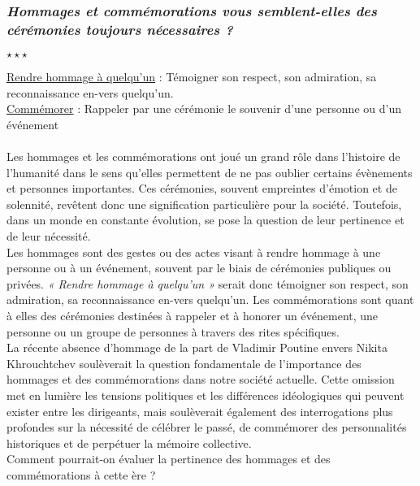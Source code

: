 \begin{center}
	\subsubsection*{\textit{Hommages et commémorations vous semblent-elles des cérémonies toujours nécessaires ?}}
	$\star \star \star$
\end{center}
\underline{Rendre hommage à quelqu’un} : Témoigner son respect, son admiration, sa reconnaissance en-vers quelqu’un.\\
\underline{Commémorer} : Rappeler par une cérémonie le souvenir d’une personne ou d’un événement\\\\
\hspace*{0.5cm}Les hommages et les commémorations ont joué un grand rôle dans l’histoire de l'humanité dans le sens qu’elles permettent de ne pas oublier certains évènements et personnes importantes. Ces cérémonies, souvent empreintes d'émotion et de solennité, revêtent donc une signification particulière pour la société. Toutefois, dans un monde en constante évolution, se pose la question de leur pertinence et de leur nécessité.\\
\hspace*{0.5cm}Les hommages sont des gestes ou des actes visant à rendre hommage à une personne ou à un événement, souvent par le biais de cérémonies publiques ou privées. \textit{« Rendre hommage à quelqu’un »} serait donc témoigner son respect, son admiration, sa reconnaissance en-vers quelqu’un. Les commémorations sont quant à elles des cérémonies destinées à rappeler et à honorer un événement, une personne ou un groupe de personnes à travers des rites spécifiques.\\
\hspace*{0.5cm}La récente absence d’hommage de la part de Vladimir Poutine envers Nikita Khrouchtchev soulèverait la question fondamentale de l’importance des hommages et des commémorations dans notre société actuelle. Cette omission met en lumière les tensions politiques et les différences idéologiques qui peuvent exister entre les dirigeants, mais soulèverait également des interrogations plus profondes sur la nécessité de célébrer le passé, de commémorer des personnalités historiques et de perpétuer la mémoire collective.\\
\hspace*{0.5cm}Comment pourrait-on évaluer la pertinence des hommages et des commémorations à cette ère ?\\
